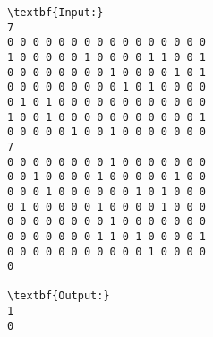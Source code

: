 \begin{verbatim}
\textbf{Input:}
7
0 0 0 0 0 0 0 0 0 0 0 0 0 0 0 0
1 0 0 0 0 0 1 0 0 0 0 1 1 0 0 1
0 0 0 0 0 0 0 0 1 0 0 0 0 1 0 1
0 0 0 0 0 0 0 0 0 1 0 1 0 0 0 0
0 1 0 1 0 0 0 0 0 0 0 0 0 0 0 0
1 0 0 1 0 0 0 0 0 0 0 0 0 0 0 1
0 0 0 0 0 1 0 0 1 0 0 0 0 0 0 0
7
0 0 0 0 0 0 0 0 1 0 0 0 0 0 0 0
0 0 1 0 0 0 0 1 0 0 0 0 0 1 0 0
0 0 0 1 0 0 0 0 0 0 1 0 1 0 0 0
0 1 0 0 0 0 0 1 0 0 0 0 1 0 0 0
0 0 0 0 0 0 0 0 1 0 0 0 0 0 0 0
0 0 0 0 0 0 0 1 1 0 1 0 0 0 0 1
0 0 0 0 0 0 0 0 0 0 0 1 0 0 0 0
0

\textbf{Output:}
1
0\end{verbatim}